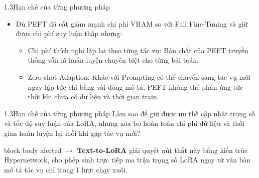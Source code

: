 \begin{frame}{1.3\quad Hạn chế của từng phương pháp}
  \begin{itemize}\tightlist
    \item Dù PEFT đã cắt giảm mạnh chi phí VRAM so với Full Fine-Tuning và giữ được chi
          phí suy luận thấp nhưng:
      \begin{itemize}\setlength{\itemsep}{0.5em}\normalsize
        \item {\color{Amber!80!black}Chi phí thích nghi lặp lại theo từng tác vụ:} Bản chất
              của PEFT truyền thống vẫn là huấn luyện chuyên biệt cho từng bài toán.
        \item {\color{Amber!80!black}Zero-shot Adaption:} Khác với Prompting có thể chuyển
              sang tác vụ mới ngay lập tức chỉ bằng vài dòng mô tả, PEFT không thể phản
              ứng tức thời khi chưa có dữ liệu và thời gian train.
      \end{itemize}
  \end{itemize}
\end{frame}

\begin{frame}{1.3\quad Hạn chế của từng phương pháp}
  \vspace{0.4em}
  \justifying
  {\large Làm sao để giữ được ưu thế cập nhật trọng số và tốc độ suy luận của LoRA, nhưng
  xóa bỏ hoàn toàn chi phí dữ liệu và thời gian huấn luyện lại mỗi khi gặp tác vụ mới?}

  \vspace{1.2em}
  \begin{beamercolorbox}[wd=\linewidth,sep=0.7em]{block body alerted}
    $\rightarrow$ \textbf{Text-to-LoRA} giải quyết nút thắt này bằng kiến trúc Hypernetwork,
    cho phép sinh trực tiếp ma trận trọng số LoRA ngay từ văn bản mô tả tác vụ chỉ trong
    1 lượt chạy xuôi.
  \end{beamercolorbox}
\end{frame}
